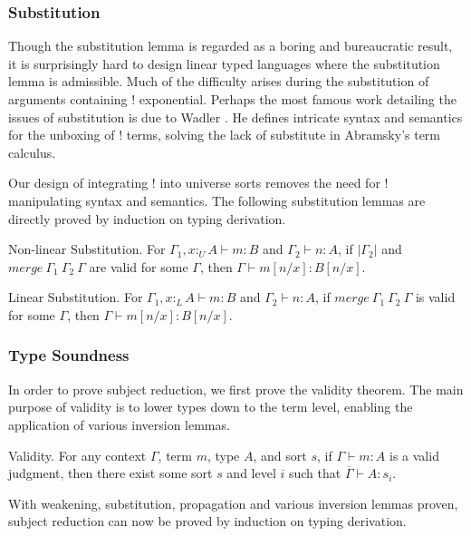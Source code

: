 \documentclass[sigplan,screen,review,anonymous]{acmart}
\newcommand{\pure}[1]{|#1|}
\newcommand{\utype}{:_{\scriptscriptstyle U}}
\newcommand{\ltype}{:_{\scriptscriptstyle L}}
\newcommand{\mrg}[3]{merge\ {#1}\ {#2}\ {#3}}
\begin{document}
\subsubsection{Substitution} \label{subst}
Though the substitution lemma is regarded as a boring and bureaucratic result, it is surprisingly hard to design linear typed languages where the substitution lemma is admissible. Much of the difficulty arises during the substitution of arguments containing ! exponential. Perhaps the most famous work detailing the issues of substitution is due to Wadler \cite{substitute}. He defines intricate syntax and semantics for the unboxing of ! terms, solving the lack of substitute in Abramsky's term calculus.

Our design of integrating ! into universe sorts removes the need for ! manipulating syntax and semantics. The following substitution lemmas are directly proved by induction on typing derivation.

\begin{lemma}
  Non-linear Substitution. For $\Gamma_1, x \utype A \vdash m : B$ and $\Gamma_2 \vdash n : A$, if $\pure{\Gamma_2}$ and $\mrg{\Gamma_1}{\Gamma_2}{\Gamma}$ are valid for some $\Gamma$, then $\Gamma \vdash m[n/x] : B[n/x]$.
\end{lemma}

\begin{lemma}
  Linear Substitution. For $\Gamma_1, x \ltype A \vdash m : B$ and $\Gamma_2 \vdash n : A$, if $\mrg{\Gamma_1}{\Gamma_2}{\Gamma}$ is valid for some $\Gamma$, then $\Gamma \vdash m[n/x] : B[n/x]$.
\end{lemma}

\subsubsection{Type Soundness}
In order to prove subject reduction, we first prove the validity theorem. The main purpose of validity is to lower types down to the term level, enabling the application of various inversion lemmas.

\begin{theorem}
  Validity. For any context $\Gamma$, term $m$, type $A$, and sort $s$, if $\Gamma \vdash m : A$ is a valid judgment, then there exist some sort $s$ and level $i$ such that $\overline{\Gamma} \vdash A : s_i$.
  \label{validity}
\end{theorem}

With weakening, substitution, propagation and various inversion lemmas proven, subject reduction can now be proved by induction on typing derivation.
\end{document}
